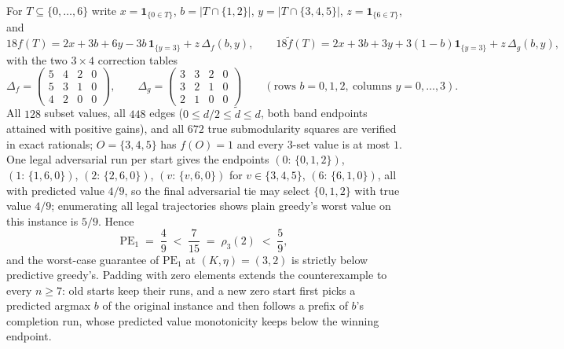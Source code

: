 For $T\subseteq\{0,\dots,6\}$ write $x=\mathbf 1_{\{0\in T\}}$,
$b=|T\cap\{1,2\}|$, $y=|T\cap\{3,4,5\}|$, $z=\mathbf 1_{\{6\in T\}}$, and
\[
  18f(T)=2x+3b+6y-3b\,\mathbf 1_{\{y=3\}}+z\,\Delta_f(b,y),
  \qquad
  18\tilde f(T)=2x+3b+3y+3(1-b)\mathbf 1_{\{y=3\}}+z\,\Delta_g(b,y),
\]
with the two $3\times4$ correction tables
\[
  \Delta_f=\begin{pmatrix}5&4&2&0\\5&3&1&0\\4&2&0&0\end{pmatrix},
  \qquad
  \Delta_g=\begin{pmatrix}3&3&2&0\\3&2&1&0\\2&1&0&0\end{pmatrix}
  \qquad(\text{rows }b=0,1,2,\ \text{columns }y=0,\dots,3).
\]
All $128$ subset values, all $448$ edges ($0\le d/2\le\tilde d\le d$, both
band endpoints attained with positive gains), and all $672$ true
submodularity squares are verified in exact rationals; $O=\{3,4,5\}$ has
$f(O)=1$ and every $3$-set value is at most $1$.  One legal adversarial
run per start gives the endpoints
$(0{:}\,\{0,1,2\})$, $(1{:}\,\{1,6,0\})$, $(2{:}\,\{2,6,0\})$,
$(v{:}\,\{v,6,0\})$ for $v\in\{3,4,5\}$, $(6{:}\,\{6,1,0\})$, all with
predicted value $4/9$, so the final adversarial tie may select
$\{0,1,2\}$ with true value $4/9$; enumerating all legal trajectories
shows plain greedy's worst value on this instance is $5/9$.  Hence
\[
  \mathrm{PE}_1\;=\;\frac49\;<\;\frac7{15}\;=\;\rho_3(2)\;<\;\frac59 ,
\]
and the worst-case guarantee of $\mathrm{PE}_1$ at $(K,\eta)=(3,2)$ is
strictly below predictive greedy's.  Padding with zero elements extends
the counterexample to every $n\ge7$: old starts keep their runs, and a new
zero start first picks a predicted argmax $b$ of the original instance and
then follows a prefix of $b$'s completion run, whose predicted value
monotonicity keeps below the winning endpoint.

